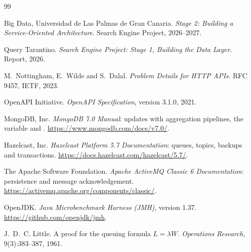 \begin{thebibliography}{99}

Big Data, Universidad de Las Palmas de Gran Canaria.
\newblock \emph{Stage 2: Building a Service-Oriented Architecture}. Search Engine Project, 2026--2027.

Query Tarantino.
\newblock \emph{Search Engine Project: Stage 1, Building the Data Layer}. Report, 2026.

M.~Nottingham, E.~Wilde and S.~Dalal.
\newblock \emph{Problem Details for HTTP APIs}. RFC 9457, IETF, 2023.

OpenAPI Initiative.
\newblock \emph{OpenAPI Specification}, version 3.1.0, 2021.

MongoDB, Inc.
\newblock \emph{MongoDB 7.0 Manual}: updates with aggregation pipelines, the  variable and .
\newblock \url{https://www.mongodb.com/docs/v7.0/}.

Hazelcast, Inc.
\newblock \emph{Hazelcast Platform 5.7 Documentation}: queues, topics, backups and transactions.
\newblock \url{https://docs.hazelcast.com/hazelcast/5.7/}.

The Apache Software Foundation.
\newblock \emph{Apache ActiveMQ Classic 6 Documentation}: persistence and message acknowledgement.
\newblock \url{https://activemq.apache.org/components/classic/}.

OpenJDK.
\newblock \emph{Java Microbenchmark Harness (JMH)}, version 1.37.
\newblock \url{https://github.com/openjdk/jmh}.

J.~D.~C. Little.
\newblock A proof for the queuing formula $L = \lambda W$.
\newblock \emph{Operations Research}, 9(3):383--387, 1961.

\end{thebibliography}
